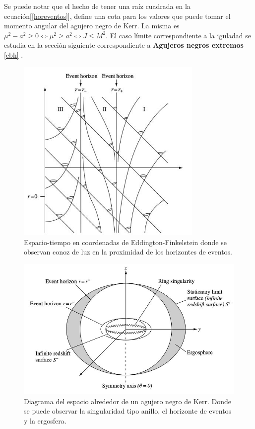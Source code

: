 \documentclass[12pt]{article}
\theoremstyle{plain}
\begin{document}
Se puede notar que el hecho de tener una raíz cuadrada en la ecuación[\ref{horeventos}], define una cota para los valores que puede tomar el momento angular del agujero negro de Kerr. La misma es $\mu ^2 -a^2\geq 0 \Leftrightarrow \mu ^2\geq a^2 \Leftrightarrow J\leq M^2$. El caso límite correspondiente a la iguladad se estudia en la sección siguiente correspondiente a \textbf{Agujeros negros extremos} \ref{ebh} .

\begin{figure}[H]
\centering
\includegraphics[width=0.8\textwidth]{conoluz.jpeg}
\caption{Espacio-tiempo en coordenadas de Eddington-Finkelstein donde se observan conoz de luz en la proximidad de los horizontes de eventos.}
\label{cono_foto}
\end{figure}

\begin{figure}[H]
\centering
\includegraphics[width=\textwidth]{kerr.jpeg}
\caption{Diagrama del espacio alrededor de un agujero negro de Kerr. Donde se puede observar la singularidad tipo anillo, el horizonte de eventos y la ergosfera.}
\label{kerr_metric}
\end{figure}
\end{document}
